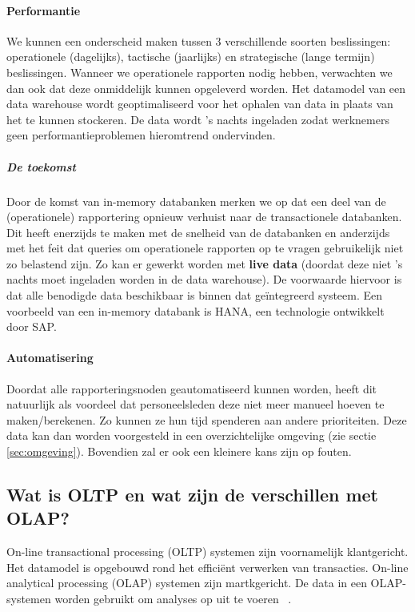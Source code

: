 \paragraph{Performantie}
We kunnen een onderscheid maken tussen 3 verschillende soorten beslissingen: operationele (dagelijks), tactische (jaarlijks) en strategische (lange termijn) beslissingen. Wanneer we operationele rapporten nodig hebben, verwachten we dan ook dat deze onmiddelijk kunnen opgeleverd worden. Het datamodel van een data warehouse wordt geoptimaliseerd voor het ophalen van data in plaats van het te kunnen stockeren. De data wordt 's nachts ingeladen zodat werknemers geen performantieproblemen hieromtrend ondervinden. 

\subparagraph{De toekomst}
Door de komst van in-memory databanken merken we op dat een deel van de (operationele) rapportering opnieuw verhuist naar de transactionele databanken. Dit heeft enerzijds te maken met de snelheid van de databanken en anderzijds met het feit dat queries om operationele rapporten op te vragen gebruikelijk niet zo belastend zijn. Zo kan er gewerkt worden met \textbf{live data} (doordat deze niet 's nachts moet ingeladen worden in de data warehouse). De voorwaarde hiervoor is dat alle benodigde data beschikbaar is binnen dat geïntegreerd systeem. Een voorbeeld van een in-memory databank is HANA, een technologie ontwikkelt door SAP.

\paragraph{Automatisering}
Doordat alle rapporteringsnoden geautomatiseerd kunnen worden, heeft dit natuurlijk als voordeel dat personeelsleden deze niet meer manueel hoeven te maken/berekenen. Zo kunnen ze hun tijd spenderen aan andere prioriteiten. Deze data kan dan worden voorgesteld in een overzichtelijke omgeving (zie sectie \ref{sec:omgeving}). Bovendien zal er ook een kleinere kans zijn op fouten.

\subsection{Wat is OLTP en wat zijn de verschillen met OLAP?}
\label{sec:oltp-vs-olap}
On-line transactional processing (OLTP) systemen zijn voornamelijk klantgericht. Het datamodel is opgebouwd rond het efficiënt verwerken van transacties. On-line analytical processing (OLAP) systemen zijn martkgericht. De data in een OLAP-systemen worden gebruikt om analyses op uit te voeren ~\autocite{Satyanarayana2010}.


